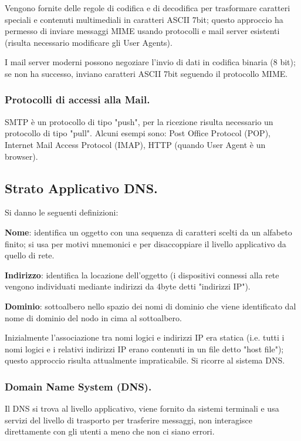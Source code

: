 \documentclass[11pt, italian, openany]{book}
\begin{document}
\begin{sloppypar}
Vengono fornite delle regole di codifica e di decodifica per trasformare caratteri speciali e contenuti multimediali in caratteri ASCII 7bit;
questo approccio ha permesso di inviare messaggi MIME usando protocolli e mail server esistenti (risulta necessario modificare gli User Agents).

I mail server moderni possono negoziare l'invio di dati in codifica binaria (8 bit); se non ha successo, inviano caratteri ASCII 7bit seguendo
il protocollo MIME.

\subsubsection*{Protocolli di accessi alla Mail.}
SMTP \`e un protocollo di tipo "push", per la ricezione risulta necessario un protocollo di tipo "pull". Alcuni esempi sono: Post Office Protocol
(POP), Internet Mail Access Protocol (IMAP), HTTP (quando User Agent è un browser).

\subsection*{Strato Applicativo DNS.}
Si danno le seguenti definizioni:

\textbf{Nome}: identifica un oggetto con una sequenza di caratteri scelti da un alfabeto finito; si usa per motivi mnemonici e per disaccoppiare
il livello applicativo da quello di rete.

\textbf{Indirizzo}: identifica la locazione dell'oggetto (i dispositivi connessi alla rete vengono individuati mediante indirizzi da 4byte detti
"indirizzi IP").

\textbf{Dominio}: sottoalbero nello spazio dei nomi di dominio che viene identificato dal nome di dominio del nodo in cima al sottoalbero.


Inizialmente l'associazione tra nomi logici e indirizzi IP era statica (i.e. tutti i nomi logici e i relativi indirizzi IP erano contenuti in
un file detto "host file"); questo approccio risulta attualmente impraticabile. Si ricorre al sistema DNS.

\subsubsection*{Domain Name System (DNS).}
Il DNS si trova al livello applicativo, viene fornito da sistemi terminali e usa servizi del livello di trasporto per trasferire messaggi,
non interagisce direttamente con gli utenti a meno che non ci siano errori.


\end{sloppypar}
\end{document}

